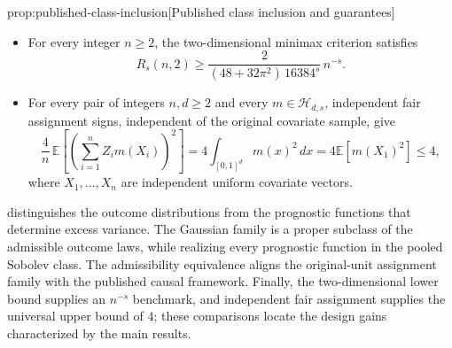 \begin{propositionv}{prop:published-class-inclusion}[Published class inclusion and guarantees]
\begin{itemize}
\item For every integer \(n\geq2\), the two-dimensional minimax criterion satisfies
\[
R_s(n,2)\geq
\frac{2}{(48+32\pi^2)\,16384^s}\,n^{-s}.
\]

\item For every pair of integers \(n,d\geq2\) and every \(m\in\mathcal H_{d,s}\), independent fair assignment signs, independent of the original covariate sample, give
\[
\frac4n\,\mathbb E\!\left[
\left(\sum_{i=1}^n Z_i m(X_i)\right)^2
\right]
=
4\int_{[0,1]^d}m(x)^2\,dx
=
4\mathbb E[m(X_1)^2]
\leq4,
\]
where \(X_1,\ldots,X_n\) are independent uniform covariate vectors.
\end{itemize}
\end{propositionv}

 distinguishes the outcome distributions from the prognostic functions that determine excess variance. The Gaussian family is a proper subclass of the admissible outcome laws, while realizing every prognostic function in the pooled Sobolev class. The admissibility equivalence aligns the original-unit assignment family with the published causal framework. Finally, the two-dimensional lower bound supplies an \(n^{-s}\) benchmark, and independent fair assignment supplies the universal upper bound of \(4\); these comparisons locate the design gains characterized by the main results.
